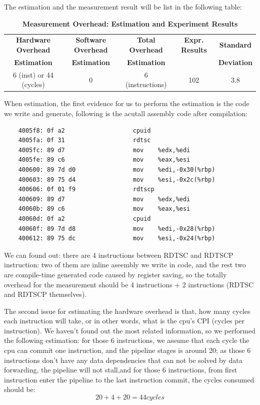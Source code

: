 The estimation and the measurement result will be list in the following table:

\begin{table}[ht]
  \centering
  \caption{\textbf{Measurement Overhead: Estimation and Experiment Results}}
  \begin{threeparttable}
  \begin{tabular}{ccccc}
  \hline
      \textbf{Hardware Overhead} & \textbf{Software Overhead } & \textbf{Total Overhead} & \textbf{Expr. Results} & \textbf{Standard} \\
      \textbf{Estimation}       &  \textbf{Estimation}         & \textbf{Estimation}  &   & \textbf{Deviation}  \\
  \hline
      6 (inst) or 44 (cycles) & 0 & 6 (instructions) & 102 & 3.8\\
  \hline
  \end{tabular}
  \end{threeparttable}
  \label{measurement_overhead_table}
\end{table}

When estimation, the first evidence for us to perform the estimation is the code we write and generate, following is the acutall assembly code after compilation:

\begin{lstlisting}
    4005f8:	0f a2                	cpuid
    4005fa:	0f 31                	rdtsc
    4005fc:	89 d7                	mov    %edx,%edi
    4005fe:	89 c6                	mov    %eax,%esi
    400600:	89 7d d0             	mov    %edi,-0x30(%rbp)
    400603:	89 75 d4             	mov    %esi,-0x2c(%rbp)
    400606:	0f 01 f9             	rdtscp
    400609:	89 d7                	mov    %edx,%edi
    40060b:	89 c6                	mov    %eax,%esi
    40060d:	0f a2                	cpuid
    40060f:	89 7d d8             	mov    %edi,-0x28(%rbp)
    400612:	89 75 dc             	mov    %esi,-0x24(%rbp)
\end{lstlisting}

We can found out: there are 4 instructions between RDTSC and RDTSCP instruction: two of them are inline aseembly we write in code, and the rest two are compile-time generated code caused by
register saving, so the totally overhead for the measurement should be 4 instructions + 2 instructions (RDTSC and RDTSCP themselves).

The second issue for estimating the hardware overhead is that, how many cycles each instruction will take, or in other words, what is the cpu's CPI (cycles per instruction). We haven't found out
the most related information, so we performed the following estimation: for those 6 instructions, we assume that each cycle the cpu can commit one instruction, and the pipeline stages is around 20;
as those 6 instructions don't have any data dependencies that can not be solved by data forwarding, the pipeline will not stall,and for those 6 instructions, from first instruction enter the pipeline
to the last instruction commit, the cycles consumed should be:
    $$ 20 + 4 + 20 = 44 cycles $$

